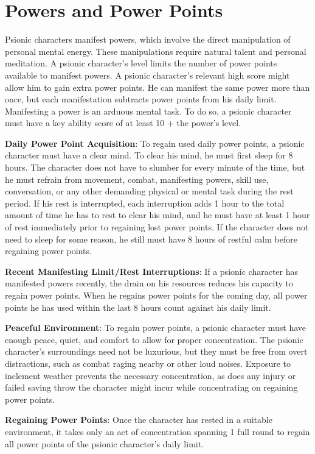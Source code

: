\section{Powers and Power Points}
Psionic characters manifest powers, which involve the direct manipulation of personal mental energy. These manipulations require natural talent and personal meditation. A psionic character's level limits the number of power points available to manifest powers. A psionic character's relevant high score might allow him to gain extra power points. He can manifest the same power more than once, but each manifestation subtracts power points from his daily limit. Manifesting a power is an arduous mental task. To do so, a psionic character must have a key ability score of at least 10 + the power's level.

\textbf{Daily Power Point Acquisition}: To regain used daily power points, a psionic character must have a clear mind. To clear his mind, he must first sleep for 8 hours. The character does not have to slumber for every minute of the time, but he must refrain from movement, combat, manifesting powers, skill use, conversation, or any other demanding physical or mental task during the rest period. If his rest is interrupted, each interruption adds 1 hour to the total amount of time he has to rest to clear his mind, and he must have at least 1 hour of rest immediately prior to regaining lost power points. If the character does not need to sleep for some reason, he still must have 8 hours of restful calm before regaining power points.

\textbf{Recent Manifesting Limit/Rest Interruptions}: If a psionic character has manifested powers recently, the drain on his resources reduces his capacity to regain power points. When he regains power points for the coming day, all power points he has used within the last 8 hours count against his daily limit.

\textbf{Peaceful Environment}: To regain power points, a psionic character must have enough peace, quiet, and comfort to allow for proper concentration. The psionic character's surroundings need not be luxurious, but they must be free from overt distractions, such as combat raging nearby or other loud noises. Exposure to inclement weather prevents the necessary concentration, as does any injury or failed saving throw the character might incur while concentrating on regaining power points.

\textbf{Regaining Power Points}: Once the character has rested in a suitable environment, it takes only an act of concentration spanning 1 full round to regain all power points of the psionic character's daily limit.

